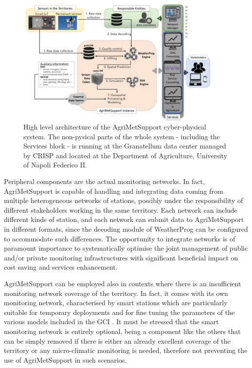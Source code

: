 \documentclass[authoryear,preprint,review,12pt]{elsarticle}
\newcommand{\note}[1]{\emph{\textcolor{red}{#1}}}
\begin{document}
\begin{figure}
	\centering %
	\includegraphics[angle=90,scale=.70,trim=1cm 2cm 8cm 2cm]{figures/AgriMetSupport-fig_v2.pdf}
	\caption{
            High level architecture of the AgriMetSupport cyber-physical system.
            The non-pysical parts of the whole system - including the Services block - is running at the Granatellum data center managed by CRISP and located at the Department of Agriculture,  University of Napoli Federico II.
 }
	\label{cyberPhysicalSystemFig}
\end{figure}

Peripheral components are the actual monitoring networks.
In fact, Agri\-Met\-Support is capable of handling and integrating data coming from multiple heterogeneous networks of stations, possibly under the responsibility of different stakeholders working in the same territory.
Each network can include different kinds of station, and each network can submit data to AgriMetSupport in different formats, since the decoding module of WeatherProg can be configured to accommodate such differences.
The opportunity to integrate networks is of paramount importance to systematically optimise the joint management of public and/or private monitoring infrastructures with significant beneficial impact on cost saving and services enhancement.


AgriMetSupport can be employed also in contexts where there is an insufficient monitoring network coverage of the territory.
In fact, it comes with its own monitoring network, characterised by smart stations which are particularly suitable for temporary deployments and for fine tuning the parameters of the various models included in the GCI \citep{Martino2019AFI}.
It must be stressed that the smart monitoring network is entirely optional, being a component like the others that can be simply removed if there is either an already excellent coverage of the territory or any micro-climatic monitoring is needed, therefore not preventing the use of AgriMetSupport in such scenarios. %
\end{document}
